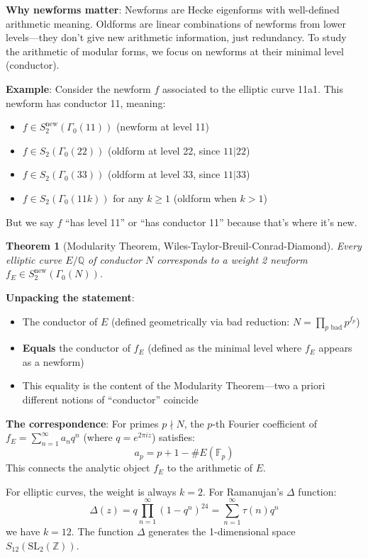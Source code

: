\documentclass[11pt]{article}
\newtheorem{theorem}{Theorem}
\begin{document}
\textbf{Why newforms matter}: Newforms are Hecke eigenforms with well-defined arithmetic meaning. Oldforms are linear combinations of newforms from lower levels---they don't give new arithmetic information, just redundancy. To study the arithmetic of modular forms, we focus on newforms at their minimal level (conductor).

\textbf{Example}: Consider the newform $f$ associated to the elliptic curve 11a1. This newform has conductor 11, meaning:
\begin{itemize}
\item $f \in S_2^{\text{new}}(\Gamma_0(11))$ (newform at level 11)
\item $f \in S_2(\Gamma_0(22))$ (oldform at level 22, since $11 | 22$)
\item $f \in S_2(\Gamma_0(33))$ (oldform at level 33, since $11 | 33$)
\item $f \in S_2(\Gamma_0(11k))$ for any $k \geq 1$ (oldform when $k > 1$)
\end{itemize}
But we say $f$ ``has level 11'' or ``has conductor 11'' because that's where it's new.

\begin{theorem}[Modularity Theorem, Wiles-Taylor-Breuil-Conrad-Diamond]
Every elliptic curve $E/\mathbb{Q}$ of conductor $N$ corresponds to a weight 2 newform $f_E \in S_2^{\text{new}}(\Gamma_0(N))$.
\end{theorem}

\textbf{Unpacking the statement}: 
\begin{itemize}
\item The conductor of $E$ (defined geometrically via bad reduction: $N = \prod_{p \text{ bad}} p^{f_p}$)
\item \textbf{Equals} the conductor of $f_E$ (defined as the minimal level where $f_E$ appears as a newform)
\item This equality is the content of the Modularity Theorem---two a priori different notions of ``conductor'' coincide
\end{itemize}

\textbf{The correspondence}: For primes $p \nmid N$, the $p$-th Fourier coefficient of $f_E = \sum_{n=1}^{\infty} a_n q^n$ (where $q = e^{2\pi iz}$) satisfies:
$$a_p = p + 1 - \#E(\mathbb{F}_p)$$
This connects the analytic object $f_E$ to the arithmetic of $E$.

For elliptic curves, the weight is always $k = 2$. For Ramanujan's $\Delta$ function:
$$\Delta(z) = q \prod_{n=1}^{\infty} (1-q^n)^{24} = \sum_{n=1}^{\infty} \tau(n) q^n$$
we have $k = 12$. The function $\Delta$ generates the 1-dimensional space $S_{12}(\text{SL}_2(\mathbb{Z}))$.
\end{document}
